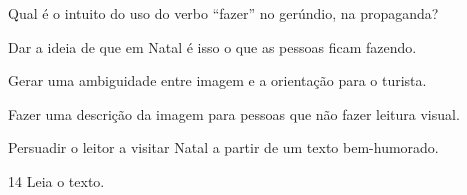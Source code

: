 \noindent Qual é o intuito do uso do verbo ``fazer'' no gerúndio, na propaganda?

\begin{escolha}
\item Dar a ideia de que em Natal é isso o que as pessoas ficam fazendo.
\item Gerar uma ambiguidade entre imagem e a orientação para o turista.
\item Fazer uma descrição da imagem para pessoas que não fazer leitura
visual.
\item Persuadir o leitor a visitar Natal a partir de um texto bem-humorado.
\end{escolha}



\num{14} Leia o texto.


